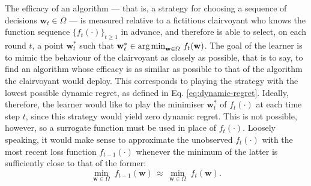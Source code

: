 The efficacy of an algorithm --- that is, a strategy for choosing a sequence of decisions $\mathbf{w}_t \in \Omega$ --- is measured relative to a fictitious clairvoyant who knows the function sequence $\{f_t(\cdot)\}_{t \geq 1}$ in advance, and therefore is able to select, on each round $t$, a point $\mathbf{w}_t^*$ such that $\mathbf{w}_t^* \in \operatorname*{arg\,min}_{\mathbf{w} \in \Omega} \, f_t(\mathbf{w})$. The goal of the learner is to mimic the behaviour of the clairvoyant as closely as possible, that is to say, to find an algorithm whose efficacy is as similar as possible to that of the algorithm the clairvoyant would deploy. This corresponds to playing the strategy with the lowest possible dynamic regret, as defined in Eq. \eqref{eq:dynamic-regret}. Ideally, therefore, the learner would like to play the minimiser $\mathbf{w}_t^*$ of $f_t(\cdot)$ at each time step $t$, since this strategy would yield zero dynamic regret. This is not possible, however, so a surrogate function must be used in place of $f_t(\cdot)$. Loosely speaking, it would make sense to approximate the unobserved $f_t(\cdot)$ with the most recent loss function $f_{t-1}(\cdot)$ whenever the minimum of the latter is sufficiently close to that of the former:
\begin{equation}
\label{eq:oco-val-fct-approx}
	\min_{\mathbf{w}\in\Omega} \; f_{t-1}(\mathbf{w})
	\, \approx \, \min_{\mathbf{w}\in\Omega} \; f_t(\mathbf{w}).
\end{equation}

